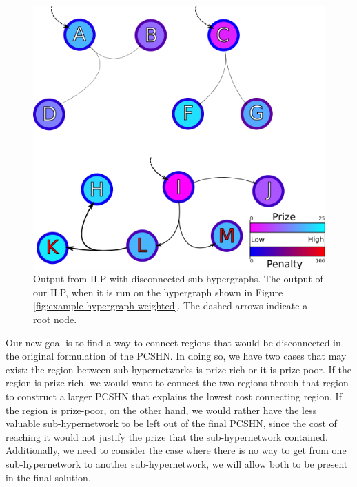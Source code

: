 \documentclass[12pt,twoside]{reedthesis}
\theoremstyle{definition}
\begin{document}
\begin{figure}[hp]
  \begin{center}
    \includegraphics[width=\textwidth]{example-hypergraph-weighted-after-ILP}
  \caption[Output from ILP with disconnected sub-hypergraphs.]{Output from ILP with disconnected sub-hypergraphs. The output of our ILP, when it is run on the hypergraph shown in Figure \ref{fig:example-hypergraph-weighted}. The dashed arrows indicate a root node.}
  \label{fig:example-hypergraph-weighted-after-ILP}
  \end{center}
\end{figure}

Our new goal is to find a way to connect regions that would be disconnected in the original formulation of the PCSHN. In doing so, we have two cases that may exist: the region between sub-hypernetworks is prize-rich or it is prize-poor. If the region is prize-rich, we would want to connect the two regions throuh that region to construct a larger PCSHN that explains the lowest cost connecting region. If the region is prize-poor, on the other hand, we would rather have the less valuable sub-hypernetwork to be left out of the final PCSHN, since the cost of reaching it would not justify the prize that the sub-hypernetwork contained. Additionally, we need to consider the case where there is no way to get from one sub-hypernetwork to another sub-hypernetwork, we will allow both to be present in the final solution.\par
\end{document}
